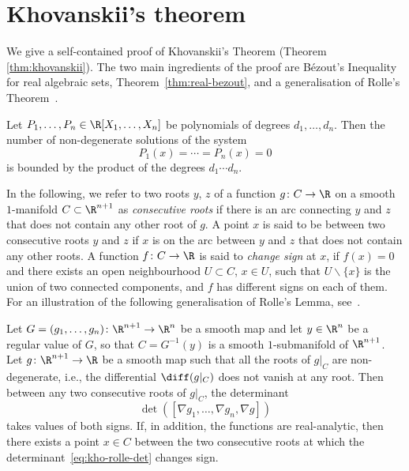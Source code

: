 \section{Khovanskii's theorem}
We give a self-contained proof of Khovanskii's Theorem (Theorem \ref{thm:khovanskii}).
The two main ingredients of the proof are B\'ezout's Inequality for real algebraic sets, Theorem~\ref{thm:real-bezout}, and a generalisation of Rolle's Theorem~\cite[\S 3.2]{khovanskii1991fewnomials}.

\begin{theorem} \label{thm:real-bezout}
  Let $P_1, \dots, P_n \in \R[X_1, \dots, X_n]$ be polynomials of degrees $d_1, \dots, d_n$. Then the number of non-degenerate solutions of the system
  \begin{equation*}
  P_1(x) = \cdots = P_n(x) = 0
  \end{equation*}
  is bounded by the product of the degrees $d_1 \cdots d_n$.
  \end{theorem}

In the following, we refer to two roots $y$, $z$ of a function $g\colon C\to \R$ on a smooth $1$-manifold $C\subset \R^{n+1}$ as {\em consecutive roots} if there is an arc connecting $y$ and $z$ that does not contain any other root of $g$. A point $x$ is said to be between two consecutive roots $y$ and $z$ if $x$ is on the arc between $y$ and $z$ that does not contain any other roots. A function $f\colon C\to \R$ is said to \emph{change sign} at $x$, if $f(x)=0$ and there exists an open neighbourhood $U\subset C$, $x\in U$, such that $U\backslash \{x\}$ is the union of two connected components, and $f$ has different signs on each of them. 
For an illustration of the following generalisation of Rolle's Lemma, see~\cite{bates2011khovanskii}.

\begin{lemma} \label{lem:kho-rolle}
Let $G = (g_1, \ldots, g_n)\colon \R^{n+1} \rightarrow \R^n$ be a smooth map and let $y \in \R^n$ be a regular value of $G$, so that $C = G^{-1}(y)$ is a smooth $1$-submanifold of $\R^{n+1}$. Let $g\colon \R^{n+1} \rightarrow \R$ be a smooth map such that all the roots of $g|_C$ are non-degenerate, i.e., the differential $\diff(g|_C)$ does not vanish at any root. Then between any two consecutive roots of $g|_C$, the determinant
\begin{equation}\label{eq:kho-rolle-det}
 \det([\nabla g_1, \ldots, \nabla g_n, \nabla g])
\end{equation}
takes values of both signs. If, in addition, the functions are real-analytic, then there exists a point $x\in C$ between the two consecutive roots at which the determinant~\eqref{eq:kho-rolle-det} changes sign.
\end{lemma}

